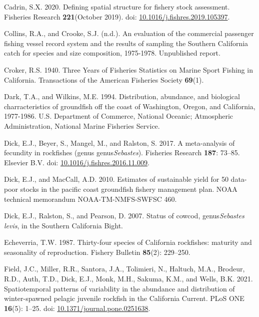 \documentclass[
  english,
  a4paper,
]{article}
\newlength{\cslhangindent}
\newlength{\cslentryspacingunit} %
\newenvironment{CSLReferences}[2] %
 {%
  \setlength{\parindent}{0pt}
  \ifodd #1
  \let\oldpar\par
  \def\par{\hangindent=\cslhangindent\oldpar}
  \fi
  \setlength{\parskip}{#2\cslentryspacingunit}
 }%
 {}
\begin{document}
\begin{CSLReferences}{1}{0}
\leavevmode{}%
Cadrin, S.X. 2020. {Defining spatial structure for fishery stock assessment}. Fisheries Research \textbf{221}(October 2019). doi: \href{https://doi.org/10.1016/j.fishres.2019.105397}{10.1016/j.fishres.2019.105397}.

\leavevmode{}%
Collins, R.A., and Crooke, S.J. (n.d.). {An evaluation of the commercial passenger fishing vessel record system and the results of sampling the Southern California catch for species and size composition, 1975-1978}. Unpublished report.

\leavevmode{}%
Croker, R.S. 1940. {Three Years of Fisheries Statistics on Marine Sport Fishing in California}. Transactions of the American Fisheries Society \textbf{69}(1).

\leavevmode{}%
Dark, T.A., and Wilkins, M.E. 1994. {Distribution, abundance, and biological charracteristics of groundfish off the coast of Washington, Oregon, and California, 1977-1986}. U.S. Department of Commerce, National Oceanic; Atmospheric Administration, National Marine Fisheries Service.

\leavevmode{}%
Dick, E.J., Beyer, S., Mangel, M., and Ralston, S. 2017. {A meta-analysis of fecundity in rockfishes (genus genus\emph{Sebastes})}. Fisheries Research \textbf{187}: 73--85. Elsevier B.V. doi: \href{https://doi.org/10.1016/j.fishres.2016.11.009}{10.1016/j.fishres.2016.11.009}.

\leavevmode{}%
Dick, E.J., and MacCall, A.D. 2010. {Estimates of sustainable yield for 50 data-poor stocks in the pacific coast groundfish fishery management plan}. NOAA technical memorandum NOAA-TM-NMFS-SWFSC 460.

\leavevmode{}%
Dick, E.J., Ralston, S., and Pearson, D. 2007. {Status of cowcod, genus\emph{Sebastes levis}, in the Southern California Bight}.

\leavevmode{}%
Echeverria, T.W. 1987. {Thirty-four species of California rockfishes: maturity and seasonality of reproduction}. Fishery Bulletin \textbf{85}(2): 229--250.

\leavevmode{}%
Field, J.C., Miller, R.R., Santora, J.A., Tolimieri, N., Haltuch, M.A., Brodeur, R.D., Auth, T.D., Dick, E.J., Monk, M.H., Sakuma, K.M., and Wells, B.K. 2021. {Spatiotemporal patterns of variability in the abundance and distribution of winter-spawned pelagic juvenile rockfish in the California Current}. PLoS ONE \textbf{16}(5): 1--25. doi: \href{https://doi.org/10.1371/journal.pone.0251638}{10.1371/journal.pone.0251638}.


\end{CSLReferences}
\end{document}
